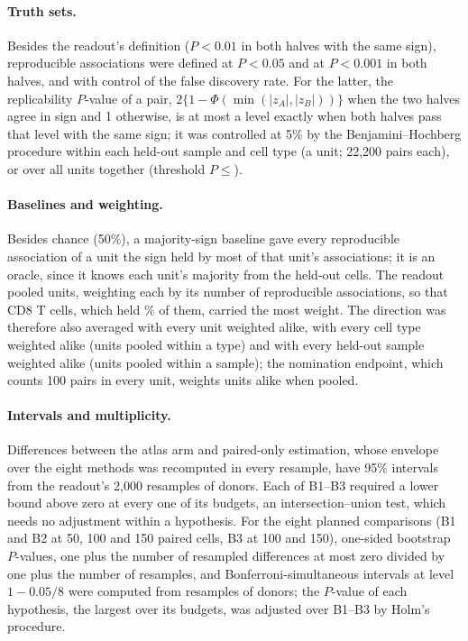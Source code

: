 \paragraph{Truth sets.} Besides the readout's definition ($P<0.01$ in both halves with the same sign), reproducible associations were defined at $P<0.05$ and at $P<0.001$ in both halves, and with control of the false discovery rate. For the latter, the replicability $P$-value of a pair, $2\{1-\Phi(\min(|z_A|,|z_B|))\}$ when the two halves agree in sign and 1 otherwise, is at most a level exactly when both halves pass that level with the same sign; it was controlled at 5\% by the Benjamini--Hochberg procedure\cite{benjamini1995} within each held-out sample and cell type (a unit; 22,200 pairs each), or over all \BoNUnits{} units together (threshold $P\leq{}$\CbGlobalThreshold).

\paragraph{Baselines and weighting.} Besides chance (50\%), a majority-sign baseline gave every reproducible association of a unit the sign held by most of that unit's associations; it is an oracle, since it knows each unit's majority from the held-out cells. The readout pooled units, weighting each by its number of reproducible associations, so that CD8 T cells, which held \CbShareCDEightPrimary\% of them, carried the most weight. The direction was therefore also averaged with every unit weighted alike, with every cell type weighted alike (units pooled within a type) and with every held-out sample weighted alike (units pooled within a sample); the nomination endpoint, which counts 100 pairs in every unit, weights units alike when pooled.

\paragraph{Intervals and multiplicity.} Differences between the atlas arm and paired-only estimation, whose envelope over the eight methods was recomputed in every resample, have 95\% intervals from the readout's 2,000 resamples of donors. Each of B1--B3 required a lower bound above zero at every one of its budgets, an intersection--union test\cite{berger1982}, which needs no adjustment within a hypothesis. For the eight planned comparisons (B1 and B2 at 50, 100 and 150 paired cells, B3 at 100 and 150), one-sided bootstrap $P$-values, one plus the number of resampled differences at most zero divided by one plus the number of resamples, and Bonferroni-simultaneous intervals at level $1-0.05/8$ were computed from \CbBoot{} resamples of donors; the $P$-value of each hypothesis, the largest over its budgets, was adjusted over B1--B3 by Holm's procedure\cite{holm1979}.

